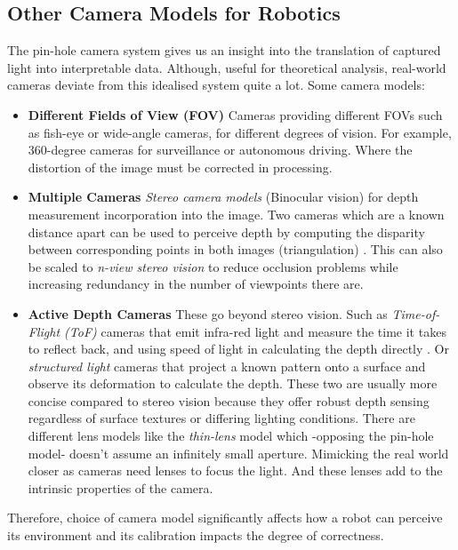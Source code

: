 \subsection{Other Camera Models for Robotics}
The pin-hole camera system gives us an insight into the translation of captured light into interpretable data. Although, useful for theoretical analysis, real-world cameras deviate from this idealised system quite a lot. Some camera models:
\begin{itemize}
  \itemsep0em
  \item\textbf{Different Fields of View (FOV)}
  Cameras providing different FOVs such as fish-eye or wide-angle cameras, for different degrees of vision. For example, 360-degree cameras for surveillance or autonomous driving. Where the distortion of the image must be corrected in processing.

  \item\textbf{Multiple Cameras}
  \emph{Stereo camera models} (Binocular vision) for depth measurement incorporation into the image. Two cameras which are a known distance apart can be used to perceive depth by computing the disparity between corresponding points in both images (triangulation) \cite{hamzah2016literature}. This can also be scaled to \emph{n-view stereo vision} to reduce occlusion problems while increasing redundancy in the number of viewpoints there are.\label{sec:nview}
  
  \item\textbf{Active Depth Cameras}
  These go beyond stereo vision. Such as \emph{Time-of-Flight (ToF)} cameras that emit infra-red light and measure the time it takes to reflect back, and using speed of light in calculating the depth directly \cite{foix2011tof,zanuttigh2016time}. Or \emph{structured light} cameras that project a known pattern onto a surface and observe its deformation to calculate the depth. These two are usually more concise compared to stereo vision because they offer robust depth sensing regardless of surface textures or differing lighting conditions.
  There are different lens models like the \emph{thin-lens} model which -opposing the pin-hole model- doesn't assume an infinitely small aperture. Mimicking the real world closer as cameras need lenses to focus the light. And these lenses add to the intrinsic properties of the camera.
\end{itemize}
  Therefore, choice of camera model significantly affects how a robot can perceive its environment and its calibration impacts the degree of correctness.
  
